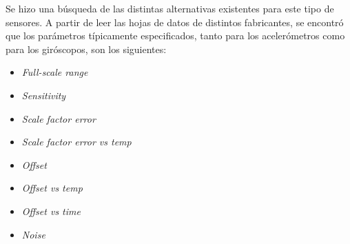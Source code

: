 





Se hizo una búsqueda de las distintas alternativas existentes para este tipo de sensores. A partir de leer las hojas de datos de distintos fabricantes, se encontró que los parámetros típicamente especificados, tanto para los acelerómetros como para los giróscopos, son los siguientes:

\begin{itemize}
    \item \textit{Full-scale range}
    \item \textit{Sensitivity}
    \item \textit{Scale factor error}
    \item \textit{Scale factor error vs temp}
    \item \textit{Offset}
    \item \textit{Offset vs temp}
    \item \textit{Offset vs time}
    \item \textit{Noise}
\end{itemize}

